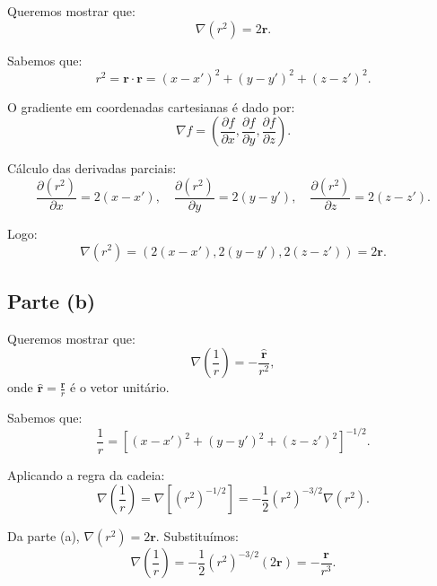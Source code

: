 \documentclass[a4paper,12pt]{article}
\begin{document}
Queremos mostrar que:
\begin{equation}
\nabla (r^2) = 2\mathbf{r}.
\end{equation}

Sabemos que:
\begin{equation}
r^2 = \mathbf{r} \cdot \mathbf{r} = (x - x')^2 + (y - y')^2 + (z - z')^2.
\end{equation}

O gradiente em coordenadas cartesianas é dado por:
\begin{equation}
\nabla f = \left( \frac{\partial f}{\partial x}, \frac{\partial f}{\partial y}, \frac{\partial f}{\partial z} \right).
\end{equation}

Cálculo das derivadas parciais:
\begin{equation}
\frac{\partial (r^2)}{\partial x} = 2(x - x'), \quad
\frac{\partial (r^2)}{\partial y} = 2(y - y'), \quad
\frac{\partial (r^2)}{\partial z} = 2(z - z').
\end{equation}

Logo:
\begin{equation}
\nabla (r^2) = \left( 2(x - x'), 2(y - y'), 2(z - z') \right) = 2\mathbf{r}.
\end{equation}

\subsection*{Parte (b)}

Queremos mostrar que:
\begin{equation}
\nabla \left(\frac{1}{r}\right) = -\frac{\hat{\mathbf{r}}}{r^2},
\end{equation}
onde \(\hat{\mathbf{r}} = \frac{\mathbf{r}}{r}\) é o vetor unitário.

Sabemos que:
\begin{equation}
\frac{1}{r} = \left[ (x - x')^2 + (y - y')^2 + (z - z')^2 \right]^{-1/2}.
\end{equation}

Aplicando a regra da cadeia:
\begin{equation}
\nabla \left(\frac{1}{r}\right) = \nabla \left[ (r^2)^{-1/2} \right] = -\frac{1}{2} (r^2)^{-3/2} \nabla (r^2).
\end{equation}

Da parte (a), \(\nabla (r^2) = 2\mathbf{r}\). Substituímos:
\begin{equation}
\nabla \left(\frac{1}{r}\right) = -\frac{1}{2} (r^2)^{-3/2} (2\mathbf{r}) = -\frac{\mathbf{r}}{r^3}.
\end{equation}
\end{document}

